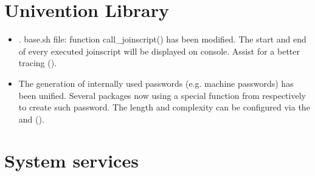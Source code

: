 




\section{Univention Library}
\begin{itemize}

\item {}. base.sh file: function call\_joinscript() has
been modified. The start and end of  every executed joinscript will be
displayed on console. Assist for a better tracing ().

\item The generation of internally used passwords (e.g. machine passwords) has
been unified. Several packages now using a special function from
 respectively  to
create such password. The length and complexity can be configured via the
 and
 ().

\end{itemize}


\section{System services}

